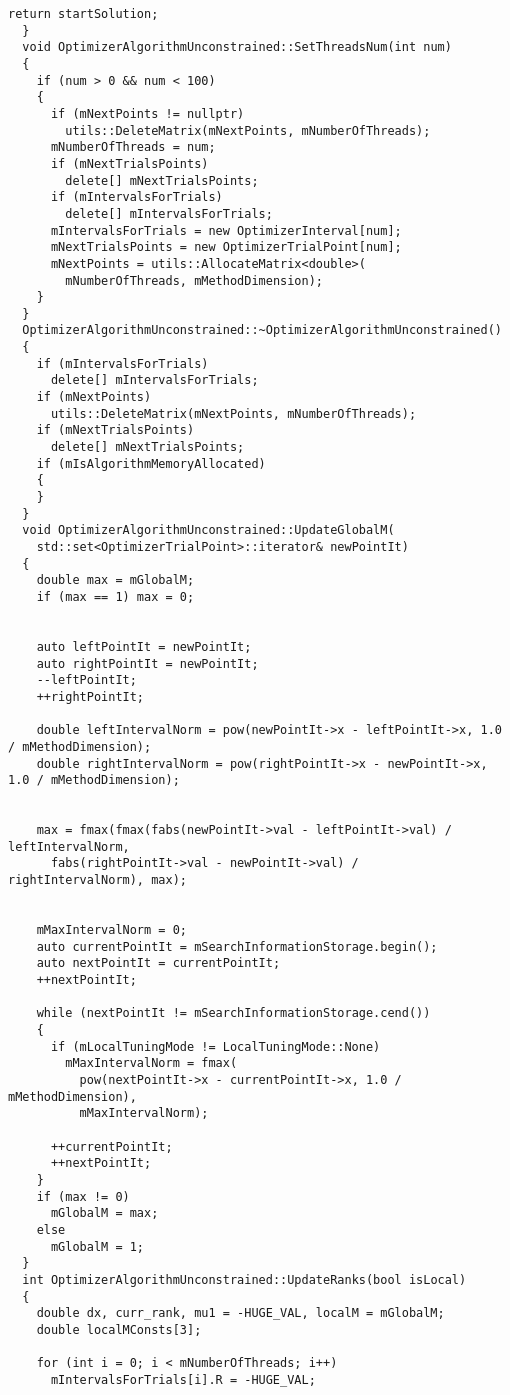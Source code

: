\begin{lstlisting}[frame=single]
    return startSolution;
  }
  void OptimizerAlgorithmUnconstrained::SetThreadsNum(int num)
  {
    if (num > 0 && num < 100)
    {
      if (mNextPoints != nullptr)
        utils::DeleteMatrix(mNextPoints, mNumberOfThreads);
      mNumberOfThreads = num;
      if (mNextTrialsPoints)
        delete[] mNextTrialsPoints;
      if (mIntervalsForTrials)
        delete[] mIntervalsForTrials;
      mIntervalsForTrials = new OptimizerInterval[num];
      mNextTrialsPoints = new OptimizerTrialPoint[num];
      mNextPoints = utils::AllocateMatrix<double>(
        mNumberOfThreads, mMethodDimension);
    }
  }
  OptimizerAlgorithmUnconstrained::~OptimizerAlgorithmUnconstrained()
  {
    if (mIntervalsForTrials)
      delete[] mIntervalsForTrials;
    if (mNextPoints)
      utils::DeleteMatrix(mNextPoints, mNumberOfThreads);
    if (mNextTrialsPoints)
      delete[] mNextTrialsPoints;
    if (mIsAlgorithmMemoryAllocated)
    {
    }
  }
  void OptimizerAlgorithmUnconstrained::UpdateGlobalM(
    std::set<OptimizerTrialPoint>::iterator& newPointIt)
  {
    double max = mGlobalM;
    if (max == 1) max = 0;


    auto leftPointIt = newPointIt;
    auto rightPointIt = newPointIt;
    --leftPointIt;
    ++rightPointIt;

    double leftIntervalNorm = pow(newPointIt->x - leftPointIt->x, 1.0 / mMethodDimension);
    double rightIntervalNorm = pow(rightPointIt->x - newPointIt->x, 1.0 / mMethodDimension);


    max = fmax(fmax(fabs(newPointIt->val - leftPointIt->val) / leftIntervalNorm,
      fabs(rightPointIt->val - newPointIt->val) /	rightIntervalNorm), max);


    mMaxIntervalNorm = 0;
    auto currentPointIt = mSearchInformationStorage.begin();
    auto nextPointIt = currentPointIt;
    ++nextPointIt;

    while (nextPointIt != mSearchInformationStorage.cend())
    {
      if (mLocalTuningMode != LocalTuningMode::None)
        mMaxIntervalNorm = fmax(
          pow(nextPointIt->x - currentPointIt->x, 1.0 / mMethodDimension),
          mMaxIntervalNorm);

      ++currentPointIt;
      ++nextPointIt;
    }
    if (max != 0)
      mGlobalM = max;
    else
      mGlobalM = 1;
  }
  int OptimizerAlgorithmUnconstrained::UpdateRanks(bool isLocal)
  {
    double dx, curr_rank, mu1 = -HUGE_VAL, localM = mGlobalM;
    double localMConsts[3];

    for (int i = 0; i < mNumberOfThreads; i++)
      mIntervalsForTrials[i].R = -HUGE_VAL;


\end{lstlisting}
